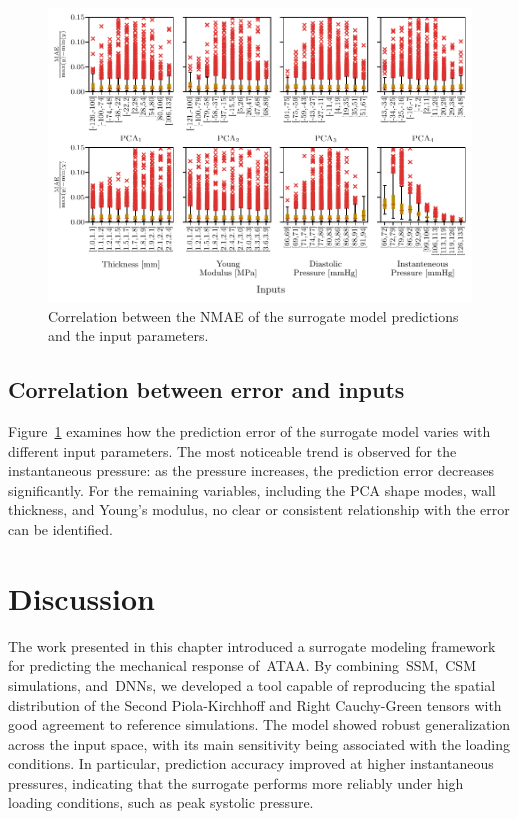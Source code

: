 \documentclass[a4paper,fleqn]{cas-sc}
\begin{document}
    \begin{figure}
      \centering
      \includegraphics[width=1\textwidth]{fig8}
      \caption{Correlation between the NMAE of the surrogate model predictions and the input parameters.}
      \label{fig:inVsout}
    \end{figure}

\subsection{Correlation between error and inputs}
  Figure~\ref{fig:inVsout} examines how the prediction error of the surrogate model varies with different input parameters. The most noticeable trend is observed for the instantaneous pressure: as the pressure increases, the prediction error decreases significantly. For the remaining variables, including the PCA shape modes, wall thickness, and Young's modulus, no clear or consistent relationship with the error can be identified. 


\section{Discussion} \label{sec:discussion}
The work presented in this chapter introduced a surrogate modeling framework for predicting the mechanical response of~\gls{ATAA}. By combining~\gls{SSM},~\gls{CSM} simulations, and~\glspl{DNN}, we developed a tool capable of reproducing the spatial distribution of the Second Piola-Kirchhoff and Right Cauchy-Green tensors with good agreement to reference simulations. The model showed robust generalization across the input space, with its main sensitivity being associated with the loading conditions. In particular, prediction accuracy improved at higher instantaneous pressures, indicating that the surrogate performs more reliably under high loading conditions, such as peak systolic pressure.
\end{document}
